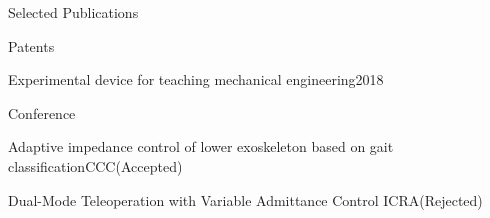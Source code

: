 \begin{rSection}{Selected Publications}

\begin{pubSubsectionNum}{Patents}
	\item {Experimental device for teaching mechanical engineering}\hfill{2018}
\end{pubSubsectionNum}
\begin{pubSubsectionNum}{Conference}
	\item {Adaptive impedance control of lower exoskeleton based on gait classification}\hfill{CCC(Accepted)}
	\item {Dual-Mode Teleoperation with Variable Admittance Control} \hfill{ICRA(Rejected)}
\end{pubSubsectionNum}

\end{rSection}
